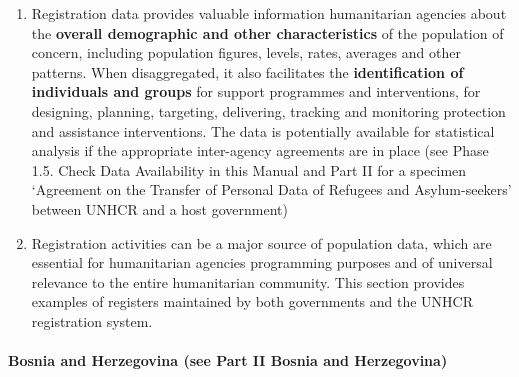 \documentclass[
]{article}
\begin{document}
\begin{enumerate}
\def\labelenumi{\arabic{enumi}.}
\setcounter{enumi}{172}
\item
  Registration data provides valuable information humanitarian
  agencies about the \textbf{overall demographic and other characteristics}
  of the population of concern, including population figures, levels,
  rates, averages and other patterns. When disaggregated, it also
  facilitates the \textbf{identification of individuals and groups} for
  support programmes and interventions, for designing, planning,
  targeting, delivering, tracking and monitoring protection and
  assistance interventions. The data is potentially available for
  statistical analysis if the appropriate inter-agency agreements are
  in place (see Phase 1.5. Check Data Availability in this Manual and
  Part II for a specimen `Agreement on the Transfer of Personal Data
  of Refugees and Asylum-seekers' between UNHCR and a host government)
\item
  Registration activities can be a major source of population data,
  which are essential for humanitarian agencies programming purposes
  and of universal relevance to the entire humanitarian community.
  This section provides examples of registers maintained by both
  governments and the UNHCR registration system.
\end{enumerate}

\hypertarget{bosnia-and-herzegovina-see-part-ii-bosnia-and-herzegovina}{%
\paragraph{Bosnia and Herzegovina (see Part II Bosnia and Herzegovina)}\label{bosnia-and-herzegovina-see-part-ii-bosnia-and-herzegovina}}
\end{document}

